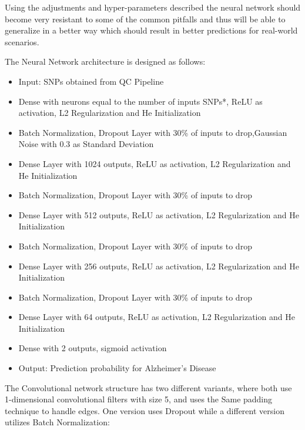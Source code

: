 Using the adjustments and hyper-parameters described the neural network should become very resistant to some of the common pitfalls and thus will be able to generalize in a better way which should result in better predictions for real-world scenarios.

The Neural Network architecture is designed as follows:
\begin{itemize}
    \item{Input: SNPs obtained from QC Pipeline
    }
    \item{Dense with neurons equal to the number of inputs SNPs*, ReLU as activation, L2 Regularization and He Initialization}
    \item{Batch Normalization, Dropout Layer with 30\% of inputs to drop,Gaussian Noise with 0.3 as Standard Deviation}
    \item{Dense Layer with 1024 outputs, ReLU as activation,  L2 Regularization and He Initialization}
    \item{Batch Normalization, Dropout Layer with 30\% of inputs to drop}
    \item{Dense Layer with 512 outputs, ReLU as activation,  L2 Regularization and He Initialization}
    \item{Batch Normalization, Dropout Layer with 30\% of inputs to drop}
    \item{Dense Layer with 256 outputs, ReLU as activation,  L2 Regularization and He Initialization}
    \item{Batch Normalization, Dropout Layer with 30\% of inputs to drop}
    \item{Dense Layer with 64 outputs, ReLU as activation,  L2 Regularization and He Initialization}
    \item{Dense with 2 outputs, sigmoid activation}
    \item{Output: Prediction probability for Alzheimer's Disease}
\end{itemize}

The Convolutional network structure has two different variants, where both use 1-dimensional convolutional filters with size 5, and uses the Same padding technique to handle edges. One version uses Dropout while a different version utilizes Batch Normalization:

